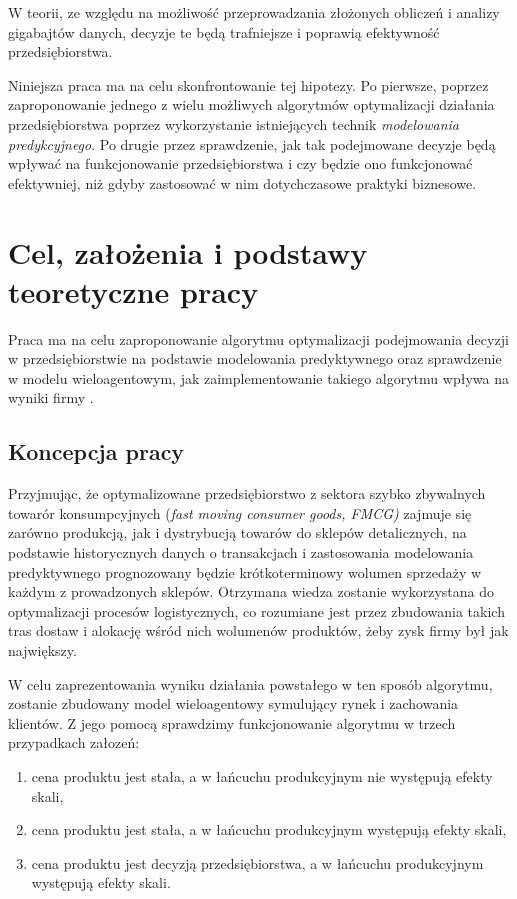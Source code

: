 \documentclass[polish, twoside, 12pt, a4paper]{article}
\theoremstyle{definition}
\theoremstyle{plain}
\theoremstyle{remark}
\begin{document}
W teorii, ze względu na możliwość przeprowadzania złożonych obliczeń i analizy gigabajtów danych, decyzje te będą trafniejsze i poprawią efektywność przedsiębiorstwa. 

Niniejsza praca ma na celu skonfrontowanie tej hipotezy. Po pierwsze, poprzez zaproponowanie jednego z wielu możliwych algorytmów optymalizacji działania przedsiębiorstwa poprzez wykorzystanie istniejących technik \textit{modelowania predykcyjnego}. Po drugie przez sprawdzenie, jak tak podejmowane decyzje będą wpływać na funkcjonowanie przedsiębiorstwa i czy będzie ono funkcjonować efektywniej, niż gdyby zastosować w nim dotychczasowe praktyki biznesowe.


\clearpage

\section{Cel, założenia i podstawy teoretyczne pracy}

Praca ma na celu zaproponowanie algorytmu optymalizacji podejmowania decyzji w przedsiębiorstwie na podstawie modelowania predyktywnego oraz sprawdzenie w modelu wieloagentowym, jak zaimplementowanie takiego algorytmu wpływa na wyniki firmy .  

\subsection{Koncepcja pracy}

Przyjmując, że optymalizowane przedsiębiorstwo z sektora szybko zbywalnych towarór konsumpcyjnych (\textit{fast moving consumer goods, FMCG)} zajmuje się zarówno produkcją, jak i dystrybucją towarów do sklepów detalicznych, na podstawie historycznych danych o transakcjach i zastosowania modelowania predyktywnego prognozowany będzie krótkoterminowy wolumen sprzedaży w każdym z prowadzonych sklepów. Otrzymana wiedza zostanie wykorzystana do optymalizacji procesów logistycznych, co rozumiane jest przez zbudowania takich tras dostaw i alokację wśród nich wolumenów produktów, żeby zysk firmy był jak największy. 

W celu zaprezentowania wyniku działania powstałego w ten sposób algorytmu, zostanie zbudowany model wieloagentowy symulujący rynek i zachowania klientów. Z jego pomocą sprawdzimy funkcjonowanie algorytmu w trzech przypadkach załozeń: 

\begin{enumerate} 
	\item cena produktu jest stała, a w łańcuchu produkcyjnym nie występują efekty skali,
	\item cena produktu jest stała, a w łańcuchu produkcyjnym występują efekty skali,
	\item cena produktu jest decyzją przedsiębiorstwa, a w łańcuchu produkcyjnym występują efekty skali.
\end{enumerate}
\end{document}

